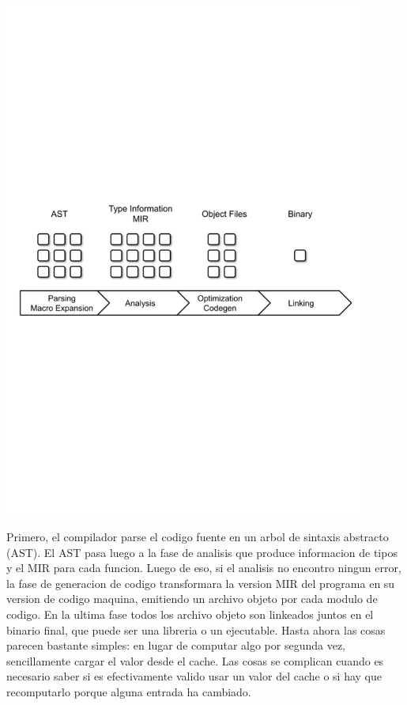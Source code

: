 \documentclass[12pt, a4paper]{report}
\begin{document}
    \noindent
    \includegraphics[width=0.9\textwidth]{woe16_compiler_phases}

    Primero, el compilador parse el codigo fuente en un arbol de sintaxis abstracto (AST).
    El AST pasa luego a la fase de analisis que produce informacion de tipos y el MIR para cada funcion.
    Luego de eso, si el analisis no encontro ningun error, la fase de generacion de codigo transformara la version MIR del programa en su version de codigo maquina, emitiendo un archivo objeto por cada modulo de codigo.
    En la ultima fase todos los archivo objeto son linkeados juntos en el binario final, que puede ser una libreria o un ejecutable.
    Hasta ahora las cosas parecen bastante simples: en lugar de computar algo por segunda vez, sencillamente cargar el valor desde el cache.
    Las cosas se complican cuando es necesario saber si es efectivamente valido usar un valor del cache o si hay que recomputarlo porque alguna entrada ha cambiado.
    \cite{rust_blog_incremental_compilation}

\end{document}
